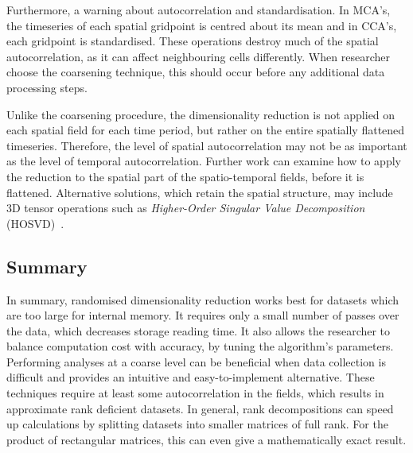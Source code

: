 \documentclass[ijgi,article,submit,moreauthors,pdftex,10pt,a4paper]{Definitions/mdpi}
\begin{document}
Furthermore, a warning about autocorrelation and standardisation. In MCA's, the timeseries of each spatial gridpoint is centred about its mean and in CCA's, each gridpoint is standardised. These operations destroy much of the spatial autocorrelation, as it can affect neighbouring cells differently. When researcher choose the coarsening technique, this should occur before any additional data processing steps.

Unlike the coarsening procedure, the dimensionality reduction is not applied on each spatial field for each time period, but rather on the entire spatially flattened timeseries. Therefore, the level of spatial autocorrelation may not be as important as the level of temporal autocorrelation. Further work can examine how to apply the reduction to the spatial part of the spatio-temporal fields, before it is flattened. Alternative solutions, which retain the spatial structure, may include 3D tensor operations such as \textit{Higher-Order Singular Value Decomposition} (HOSVD)~\cite{Tucker1964}.

\subsection{Summary}
\label{sec:Discussion/Summary} %

In summary, randomised dimensionality reduction works best for datasets which are too large for internal memory. It requires only a small number of passes over the data, which decreases storage reading time. It also allows the researcher to balance computation cost with accuracy, by tuning the algorithm's parameters. Performing analyses at a coarse level can be beneficial when data collection is difficult and provides an intuitive and easy-to-implement alternative. These techniques require at least some autocorrelation in the fields, which results in approximate rank deficient datasets. In general, rank decompositions can speed up calculations by splitting datasets into smaller matrices of full rank. For the product of rectangular matrices, this can even give a mathematically exact result.
\\ %

\end{document}
